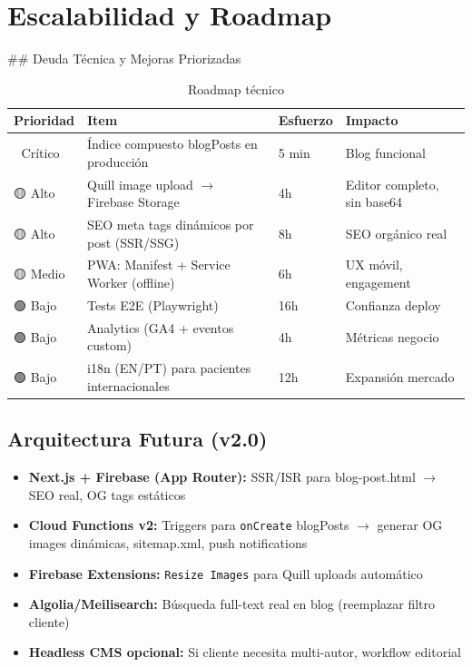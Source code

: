\documentclass[12pt,a4paper,spanish]{report}
\begin{document}
\chapter{Escalabilidad y Roadmap}
\label{ch:roadmap}

## Deuda Técnica y Mejoras Priorizadas

\begin{table}[H]
    \centering
    \caption{Roadmap técnico}
    \label{tab:roadmap}
    \begin{tabular}{llll}
        \toprule
        \textbf{Prioridad} & \textbf{Item} & \textbf{Esfuerzo} & \textbf{Impacto} \\
        \midrule
        🔴 Crítico & Índice compuesto blogPosts en producción & 5 min & Blog funcional \\
        🟡 Alto & Quill image upload $\rightarrow$ Firebase Storage & 4h & Editor completo, sin base64 \\
        🟡 Alto & SEO meta tags dinámicos por post (SSR/SSG) & 8h & SEO orgánico real \\
        🟡 Medio & PWA: Manifest + Service Worker (offline) & 6h & UX móvil, engagement \\
        🟢 Bajo & Tests E2E (Playwright) & 16h & Confianza deploy \\
        🟢 Bajo & Analytics (GA4 + eventos custom) & 4h & Métricas negocio \\
        🟢 Bajo & i18n (EN/PT) para pacientes internacionales & 12h & Expansión mercado \\
        \bottomrule
    \end{tabular}
\end{table}

\section{Arquitectura Futura (v2.0)}
\begin{itemize}
    \item \textbf{Next.js + Firebase (App Router):} SSR/ISR para blog-post.html $\rightarrow$ SEO real, OG tags estáticos
    \item \textbf{Cloud Functions v2:} Triggers para \texttt{onCreate} blogPosts $\rightarrow$ generar OG images dinámicas, sitemap.xml, push notifications
    \item \textbf{Firebase Extensions:} \texttt{Resize Images} para Quill uploads automático
    \item \textbf{Algolia/Meilisearch:} Búsqueda full-text real en blog (reemplazar filtro cliente)
    \item \textbf{Headless CMS opcional:} Si cliente necesita multi-autor, workflow editorial
\end{itemize}
\end{document}
